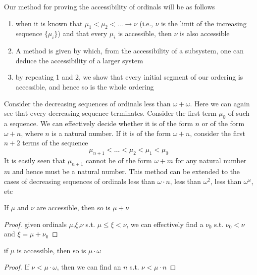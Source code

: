 \documentclass[11pt]{article}
\begin{document}
Our method for proving the accessibility of ordinals will be as follows
\begin{enumerate}
\item when it is known that \(\mu_1<\mu_2<\dots\to\nu\) (i.e., \(\nu\) is the limit of the increasing
sequence \(\{\mu_i\}\)) and that every \(\mu_i\) is accessible, then \(\nu\) is also accessible
\item A method is given by which, from the accessibility of a subsystem, one can deduce the
accessibility of a larger system
\item by repeating 1 and 2, we show that every initial segment of our ordering is accessible, and
hence so is the whole ordering
\end{enumerate}


Consider the decreasing sequences of ordinals less than \(\omega+\omega\). Here we can again see
that every decreasing sequence terminates. Consider the first term \(\mu_0\) of such a sequence.
We can effectively decide whether it is of the form \(n\) or of the form \(\omega+n\),
where \(n\) is a natural number. If it is of the form \(\omega+n\), consider the first \(n+2\)
terms of the sequence
\begin{equation*}
 \mu_{n+1}<\dots<\mu_2<\mu_1<\mu_0
\end{equation*}
It is easily seen that \(\mu_{n+1}\) cannot be of the form \(\omega+m\) for any natural
number \(m\) and hence must be a natural number. This method can be extended to the cases of
decreasing sequences of ordinals less than \(\omega\cdot n\), less than \(\omega^2\), less
than \(\omega^\omega\), etc


\begin{lemma}[]
If \(\mu\) and \(\nu\) are accessible, then so is \(\mu+\nu\)
\end{lemma}

\begin{proof}
given ordinals \(\mu\),\(\xi\),\(\nu\) s.t. \(\mu\le\xi<\nu\), we can effectively find a \(\nu_0\) s.t.
\(\nu_0<\nu\) and \(\xi=\mu+\nu_0\)
\end{proof}

\begin{lemma}[]
if \(\mu\) is accessible, then so is \(\mu\cdot\omega\)
\end{lemma}

\begin{proof}
If \(\nu<\mu\cdot\omega\), then we can find an \(n\) s.t. \(\nu<\mu\cdot n\)
\end{proof}
\end{document}
